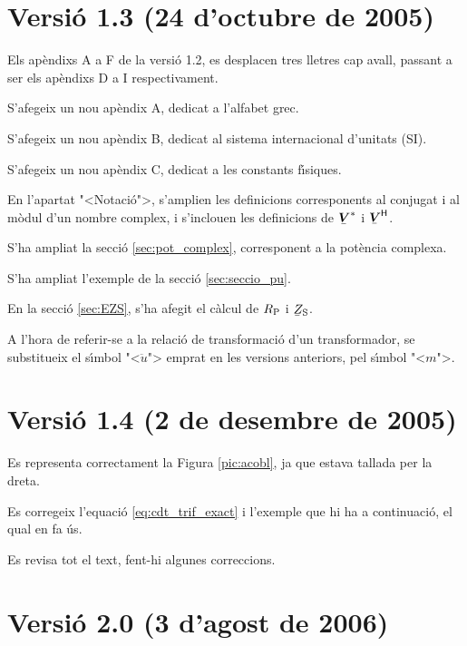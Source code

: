 \section*{Versi\'{o} 1.3 (24 d'octubre de 2005)}

Els ap\`{e}ndixs A a F de la versi\'{o} 1.2, es desplacen tres lletres cap
avall, passant a ser els ap\`{e}ndixs D a I respectivament.

S'afegeix un nou ap\`{e}ndix A, dedicat a l'alfabet grec.

S'afegeix un nou ap\`{e}ndix B, dedicat al sistema internacional
d'unitats (SI).

S'afegeix un nou ap\`{e}ndix C, dedicat a les constants f\'{\i}siques.

En l'apartat {"<}Notaci\'{o}{">}, s'amplien les definicions corresponents al
conjugat i al m\`{o}dul d'un nombre complex, i s'inclouen les
definicions de $\mcmplx{V}^*$ i $\hermit{V}$.

S'ha ampliat la secci\'{o} \ref{sec:pot_complex}, corresponent a la
pot\`{e}ncia complexa.

 S'ha ampliat l'exemple de la secci\'{o}
\ref{sec:seccio_pu}.

En la secci\'{o} \ref{sec:EZS}, s'ha afegit el c\`{a}lcul de $R_\mathrm{P}$ i
$\cmplx{Z}\ped{S}$.

 A l'hora de referir-se a la
relaci\'{o} de transformaci\'{o} d'un transformador, se substitueix el
s\'{\i}mbol {"<}$\ddot{u}${">} emprat en les versions anteriors, pel s\'{\i}mbol
{"<}$m${">}.

\section*{Versi\'{o} 1.4 (2 de desembre de 2005)}

Es representa correctament la Figura \ref{pic:acobl}, ja que estava
tallada per la dreta.

Es corregeix l'equaci\'{o} \eqref{eq:cdt_trif_exact} i l'exemple que hi
ha a continuaci\'{o}, el qual en fa \'{u}s.

Es revisa tot el text, fent-hi algunes correccions.

\section*{Versi\'{o} 2.0 (3 d'agost de 2006)}

